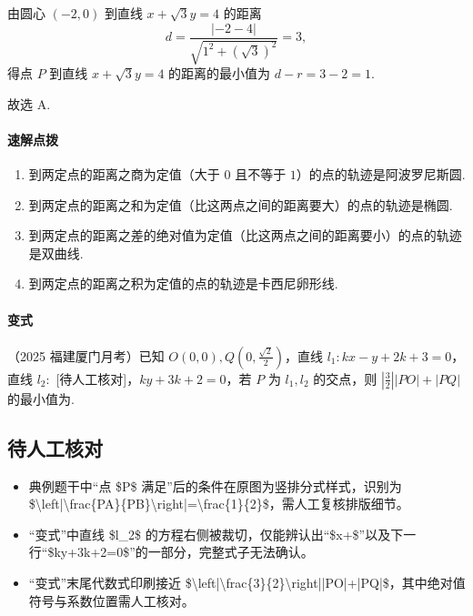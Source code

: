 \documentclass[UTF8,a4paper,11pt]{ctexart}
\begin{document}
由圆心 $(-2,0)$ 到直线 $x+\sqrt{3}y=4$ 的距离
\[
d=\frac{|{-2}-4|}{\sqrt{1^2+(\sqrt{3})^2}}=3,
\]
得点 $P$ 到直线 $x+\sqrt{3}y=4$ 的距离的最小值为 $d-r=3-2=1$.

故选 A.

\paragraph{速解点拨}
\begin{enumerate}
  \item 到两定点的距离之商为定值（大于 $0$ 且不等于 $1$）的点的轨迹是阿波罗尼斯圆.
  \item 到两定点的距离之和为定值（比这两点之间的距离要大）的点的轨迹是椭圆.
  \item 到两定点的距离之差的绝对值为定值（比这两点之间的距离要小）的点的轨迹是双曲线.
  \item 到两定点的距离之积为定值的点的轨迹是卡西尼卵形线.
\end{enumerate}

\paragraph{变式}（2025 福建厦门月考）已知 $O(0,0),Q\left(0,\frac{\sqrt{2}}{2}\right)$，直线 $l_1:kx-y+2k+3=0$，直线 $l_2:$ [待人工核对]，$ky+3k+2=0$，若 $P$ 为 $l_1,l_2$ 的交点，则 $\left|\frac{3}{2}\right||PO|+|PQ|$ 的最小值为\underline{\qquad}.

\subsection*{待人工核对}

\begin{itemize}

\item 典例题干中“点 \$P\$ 满足”后的条件在原图为竖排分式样式，识别为 \$\textbackslash{}left|\textbackslash{}frac\{PA\}\{PB\}\textbackslash{}right|=\textbackslash{}frac\{1\}\{2\}\$，需人工复核排版细节。

\item “变式”中直线 \$l\_2\$ 的方程右侧被裁切，仅能辨认出“\$x+\$”以及下一行“\$ky+3k+2=0\$”的一部分，完整式子无法确认。

\item “变式”末尾代数式印刷接近 \$\textbackslash{}left|\textbackslash{}frac\{3\}\{2\}\textbackslash{}right||PO|+|PQ|\$，其中绝对值符号与系数位置需人工核对。

\end{itemize}
\end{document}
